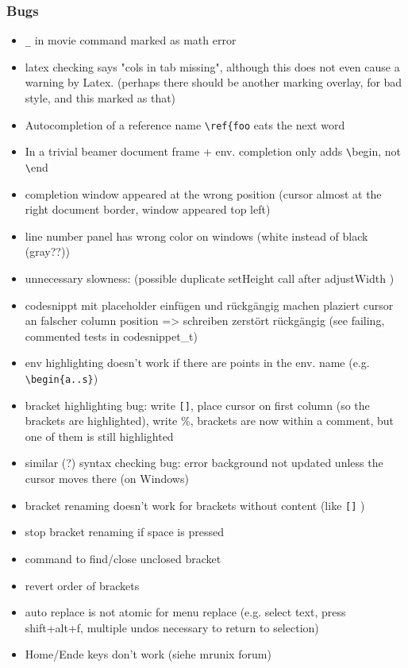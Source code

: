 \documentclass[10pt,a4paper,landscape]{report}
\begin{document}
\subsubsection{Bugs}
\begin{itemize}
\item \verb+_+ in movie command marked as math error
\item latex checking says "cols in tab missing", although this does not even cause a warning by Latex. (perhaps there should be another marking overlay, for bad style, and this marked as that)
\item Autocompletion of a reference name \verb+\ref{foo+ eats the next word
\item In a trivial beamer document frame + env. completion only adds \verb+\+begin, not \verb+\+end
\item completion window appeared at the wrong position (cursor almost at the right document border, window appeared top left)
\item line number panel has wrong color on windows (white instead of black (gray??)) 
\item unnecessary slowness: (possible duplicate setHeight call after adjustWidth )
\item codesnippt mit placeholder einfügen und rückgängig machen plaziert cursor an falscher column position => schreiben zerstört rückgängig (see failing, commented tests in codesnippet\_t)
\item  env highlighting doesn't work if there are points in the env. name (e.g. \verb+\begin{a..s}+)
\item bracket highlighting bug: write \verb+[]+, place cursor on first column (so the brackets are highlighted), write \%, brackets are now within a comment, but one of them is still highlighted
\item similar (?) syntax checking bug: error background not updated unless the cursor moves there (on Windows)
\item bracket renaming doesn't work for brackets without content (like \verb+[]+ )
\item stop bracket renaming if space is pressed
\item command to find/close unclosed bracket
\item revert order of brackets
\item auto replace is not atomic for menu replace (e.g. select text, press shift+alt+f, multiple undos necessary to return to selection)
\item Home/Ende keys don't work (siehe mrunix forum)

\end{itemize}
\end{document}

